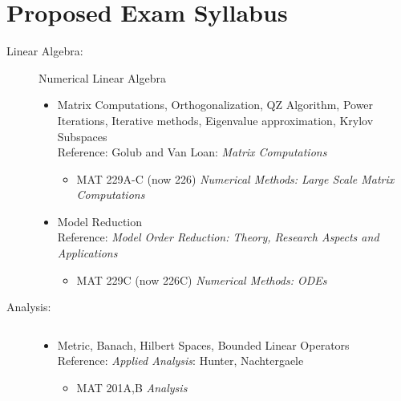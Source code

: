 \documentclass[letterpaper]{article}
\theoremstyle{remark}
\begin{document}
\clearpage
\section*{Proposed Exam Syllabus}
	\begin{description}
		\item[Linear Algebra:] Numerical Linear Algebra

			\begin{itemize}
				  
				\item Matrix Computations, Orthogonalization, QZ Algorithm, 
				Power Iterations, Iterative methods, Eigenvalue approximation,
				Krylov Subspaces
				\\
				Reference: Golub and Van Loan: \emph{Matrix Computations}\cite{GVL}
				\begin{itemize}
				\item MAT 229A-C (now 226) \emph{Numerical Methods: Large Scale Matrix Computations}
				\end{itemize}
			
				\item Model Reduction
				\\
				Reference: \emph{Model Order Reduction: Theory, Research Aspects and Applications}
				\begin{itemize}
					\item MAT 229C (now 226C) \emph{Numerical Methods: ODEs}
				\end{itemize}
			\end{itemize}

 
		\item[Analysis:] $ $
		
			\begin{itemize}
			
		 		\item Metric, Banach, Hilbert Spaces, Bounded Linear Operators\\
  					Reference: \emph{Applied Analysis}: Hunter, Nachtergaele 
  				\begin{itemize}
						\item MAT 201A,B \emph{Analysis}
				\end{itemize}
  				
	
        	\end{itemize}
  

\end{description}
\end{document}
